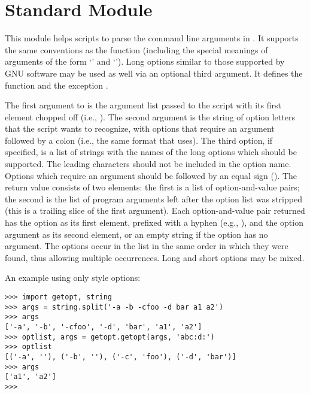 \section{Standard Module }

This module helps scripts to parse the command line arguments in
.
It supports the same conventions as the \UNIX{}
function (including the special meanings of arguments of the form
`\code{-}' and `\code{-}\code{-}').
Long options similar to those supported by
GNU software may be used as well via an optional third argument.
It defines the function
and the exception
.

The first argument to
is the argument list passed to the script with its first element
chopped off (i.e.,
).
The second argument is the string of option letters that the
script wants to recognize, with options that require an argument
followed by a colon (i.e., the same format that \UNIX{}
uses).
The third option, if specified, is a list of strings with the names of
the long options which should be supported.  The leading 
characters should not be included in the option name.  Options which
require an argument should be followed by an equal sign ().
The return value consists of two elements: the first is a list of
option-and-value pairs; the second is the list of program arguments
left after the option list was stripped (this is a trailing slice of the
first argument).
Each option-and-value pair returned has the option as its first element,
prefixed with a hyphen (e.g.,
),
and the option argument as its second element, or an empty string if the
option has no argument.
The options occur in the list in the same order in which they were
found, thus allowing multiple occurrences.  Long and short options may
be mixed.

An example using only \UNIX{} style options:

\bcode\begin{verbatim}
>>> import getopt, string
>>> args = string.split('-a -b -cfoo -d bar a1 a2')
>>> args
['-a', '-b', '-cfoo', '-d', 'bar', 'a1', 'a2']
>>> optlist, args = getopt.getopt(args, 'abc:d:')
>>> optlist
[('-a', ''), ('-b', ''), ('-c', 'foo'), ('-d', 'bar')]
>>> args
['a1', 'a2']
>>> 
\end{verbatim}\ecode


